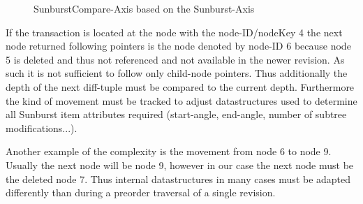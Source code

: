 \begin{figure}[tb]
\caption{\label{fig:tree-axis} SunburstCompare-Axis based on the Sunburst-Axis}
\end{figure}

If the transaction is located at the node with the node-ID/nodeKey 4 the next node returned following pointers is the node denoted by node-ID 6 because node 5 is deleted and thus not referenced and not available in the newer revision. As such it is not sufficient to follow only child-node pointers. Thus additionally the depth of the next diff-tuple must be compared to the current depth. Furthermore the kind of movement must be tracked to adjust datastructures used to determine all Sunburst item attributes required (start-angle, end-angle, number of subtree modifications...).

Another example of the complexity is the movement from node 6 to node 9. Usually the next node will be node 9, however in our case the next node must be the deleted node 7. Thus internal datastructures in many cases must be adapted differently than during a preorder traversal of a single revision.  %

